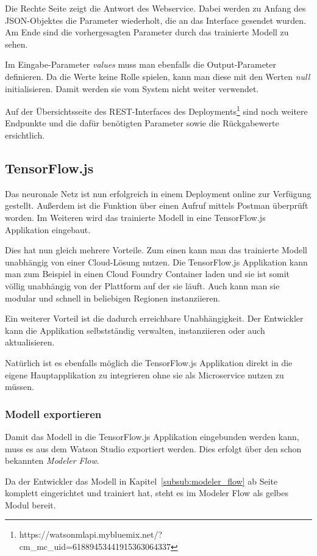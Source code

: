 Die Rechte Seite zeigt die Antwort des Webservice. Dabei werden zu Anfang des JSON-Objektes die Parameter wiederholt,
die an das Interface gesendet wurden. Am Ende sind die vorhergesagten Parameter durch das trainierte Modell zu sehen.

Im Eingabe-Parameter \textit{values} muss man ebenfalls die Output-Parameter definieren. Da die Werte keine Rolle
spielen, kann man diese mit den Werten \textit{null} initialisieren. Damit werden sie vom System nicht weiter verwendet.

Auf der Übersichtsseite des REST-Interfaces des
Deployments\footnote{https://watson\-ml\-api.mybluemix.net/?cm\_mc\_uid=61889453441915363064337} sind noch weitere
Endpunkte und die dafür benötigten Parameter sowie die Rückgabewerte ersichtlich.

\subsection{TensorFlow.js}
Das neuronale Netz ist nun erfolgreich in einem Deployment online zur Verfügung gestellt. Außerdem ist die Funktion
über einen Aufruf mittels Postman überprüft worden. Im Weiteren wird das trainierte Modell in eine TensorFlow.js
Applikation eingebaut.

Dies hat nun gleich mehrere Vorteile. Zum einen kann man das trainierte Modell unabhängig von einer Cloud-Lösung nutzen.
Die TensorFlow.js Applikation kann man zum Beispiel in einen Cloud Foundry Container laden und sie ist somit völlig
unabhängig von der Plattform auf der sie läuft. Auch kann man sie modular und schnell in beliebigen Regionen
instanziieren.

Ein weiterer Vorteil ist die dadurch erreichbare Unabhängigkeit. Der Entwickler kann die Applikation selbstständig
verwalten, instanziieren oder auch aktualisieren.

Natürlich ist es ebenfalls möglich die TensorFlow.js Applikation direkt in die eigene Hauptapplikation zu integrieren
ohne sie als Microservice nutzen zu müssen.

\subsubsection{Modell exportieren}
Damit das Modell in die TensorFlow.js Applikation eingebunden werden kann, muss es aus dem Watson Studio exportiert
werden. Dies erfolgt über den schon bekannten \textit{Modeler Flow}.

Da der Entwickler das Modell in Kapitel~\ref{subsub:modeler_flow} ab Seite~\pageref{subsub:modeler_flow} komplett
eingerichtet und trainiert hat, steht es im Modeler Flow als gelbes Modul bereit.

